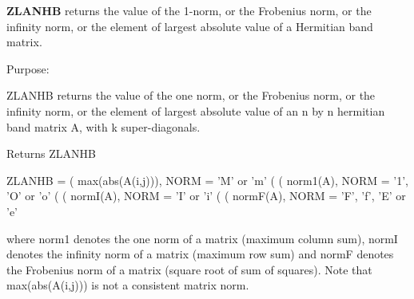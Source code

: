{\bfseries Z\+L\+A\+N\+H\+B} returns the value of the 1-\/norm, or the Frobenius norm, or the infinity norm, or the element of largest absolute value of a Hermitian band matrix. 

 \begin{DoxyParagraph}{Purpose\+: }
\begin{DoxyVerb} ZLANHB  returns the value of the one norm,  or the Frobenius norm, or
 the  infinity norm,  or the element of  largest absolute value  of an
 n by n hermitian band matrix A,  with k super-diagonals.\end{DoxyVerb}

\end{DoxyParagraph}
\begin{DoxyReturn}{Returns}
Z\+L\+A\+N\+H\+B \begin{DoxyVerb}    ZLANHB = ( max(abs(A(i,j))), NORM = 'M' or 'm'
             (
             ( norm1(A),         NORM = '1', 'O' or 'o'
             (
             ( normI(A),         NORM = 'I' or 'i'
             (
             ( normF(A),         NORM = 'F', 'f', 'E' or 'e'

 where  norm1  denotes the  one norm of a matrix (maximum column sum),
 normI  denotes the  infinity norm  of a matrix  (maximum row sum) and
 normF  denotes the  Frobenius norm of a matrix (square root of sum of
 squares).  Note that  max(abs(A(i,j)))  is not a consistent matrix norm.\end{DoxyVerb}
 
\end{DoxyReturn}

